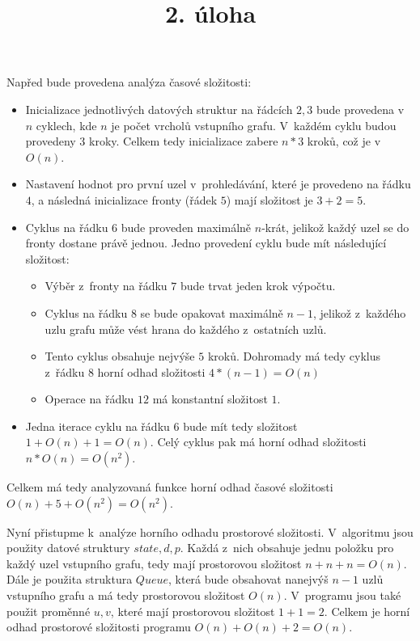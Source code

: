 \documentclass[a4paper]{article}
\title {2. úloha}
\begin{document}
\section*{}
Napřed bude provedena analýza časové složitosti:
\begin{itemize}
    \item Inicializace jednotlivých datových struktur na řádcích $2,3$ bude provedena v~$n$ cyklech, kde $n$ je počet vrcholů vstupního grafu.
    V~každém cyklu budou provedeny $3$ kroky.
    Celkem tedy inicializace zabere $n*3$ kroků, což je v~$O(n)$.
    \item Nastavení hodnot pro první uzel v~prohledávání, které je provedeno na řádku $4$, a následná inicializace fronty (řádek $5$) mají
    složitost je $3+2=5$.
    \item Cyklus na řádku $6$ bude proveden maximálně $n$-krát, jelikož každý uzel se do fronty dostane právě jednou.
    Jedno provedení cyklu bude mít následující složitost:
    \begin{itemize}
        \item Výběr z~fronty na řádku $7$ bude trvat jeden krok výpočtu.
        \item Cyklus na řádku $8$ se bude opakovat maximálně $n-1$, jelikož z~každého uzlu grafu může vést hrana do každého z~ostatních uzlů.
        \item Tento cyklus obsahuje nejvýše $5$ kroků.
        Dohromady má tedy cyklus z~řádku $8$ horní odhad složitosti $4*(n-1)=O(n)$
        \item Operace na řádku $12$ má konstantní složitost $1$.
    \end{itemize}
    \item Jedna iterace cyklu na řádku $6$ bude mít tedy složitost $1+O(n)+1=O(n)$.
    Celý cyklus pak má horní odhad složitosti $n*O(n)=O(n^2)$.
\end{itemize}
Celkem má tedy analyzovaná funkce horní odhad časové složitosti $O(n)+5+O(n^2)=O(n^2)$.

Nyní přistupme k~analýze horního odhadu prostorové složitosti.
V~algoritmu jsou použity datové struktury $state, d, p$.
Každá z~nich obsahuje jednu položku pro každý uzel vstupního grafu, tedy mají prostorovou složitost $n+n+n=O(n)$.
Dále je použita struktura $Queue$, která bude obsahovat nanejvýš $n-1$ uzlů vstupního grafu a má tedy prostorovou složitost $O(n)$.
V~programu jsou také použit proměnné $u,v$, které mají prostorovou složitost $1+1=2$.
Celkem je horní odhad prostorové složitosti programu $O(n)+O(n)+2=O(n)$.
\end{document}
